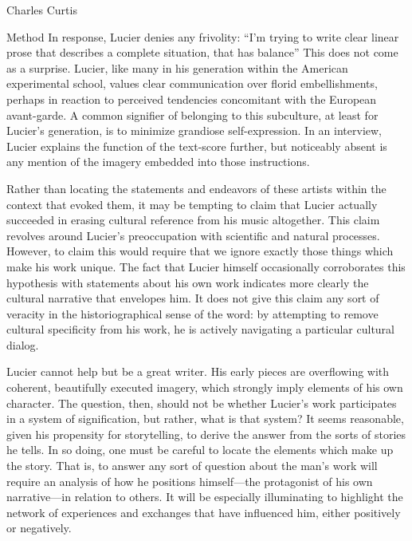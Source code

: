 \documentclass[a4paper,10pt]{report}
\numberwithin{equation}{section}
\begin{document}
\begin{chapter}{Charles Curtis}
\begin{section}{Method}
In response, Lucier denies any frivolity: ``I'm trying to write clear linear prose that describes a complete situation, that has balance''\cite[p.~16]{lucier1995} This does not come as a surprise. Lucier, like many in his generation within the American experimental school, values clear communication over florid embellishments, perhaps in reaction to perceived tendencies concomitant with the European avant-garde. A common signifier of belonging to this subculture, at least for Lucier's generation, is to minimize grandiose self-expression. In an interview, Lucier explains the function of the text-score further, but noticeably absent is any mention of the imagery embedded into those instructions.\cite[p.~138]{lucier1995}

Rather than locating the statements and endeavors of these artists within the context that evoked them, it may be tempting to claim that Lucier actually succeeded in erasing cultural reference from his music altogether. This claim revolves around Lucier's preoccupation with scientific and natural processes.\cite{yang2012} However, to claim this would require that we ignore exactly those things which make his work unique. The fact that Lucier himself occasionally corroborates this hypothesis with statements about his own work indicates more clearly the cultural narrative that envelopes him. It does not give this claim any sort of veracity in the historiographical sense of the word: by attempting to remove cultural specificity from his work, he is actively navigating a particular cultural dialog. 

Lucier cannot help but be a great writer. His early pieces are overflowing with coherent, beautifully executed imagery, which strongly imply elements of his own character. The question, then, should not be whether Lucier's work participates in a system of signification, but rather, what is that system? It seems reasonable, given his propensity for storytelling, to derive the answer from the sorts of stories he tells. In so doing, one must be careful to locate the elements which make up the story. That is, to answer any sort of question about the man's work will require an analysis of how he positions himself---the protagonist of his own narrative---in relation to others. It will be especially illuminating to highlight the network of experiences and exchanges that have influenced him, either positively or negatively. 


\end{section}
\end{chapter}
\end{document}
